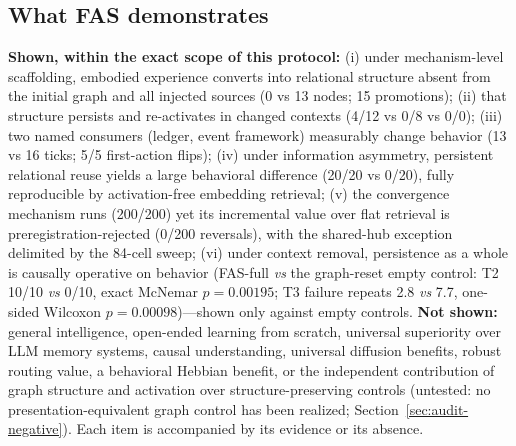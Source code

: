 \documentclass[10pt]{article}
\begin{document}
\subsection{What FAS demonstrates}
\textbf{Shown, within the exact scope of this protocol:} (i) under mechanism-level scaffolding, embodied experience converts into relational structure absent from the initial graph and all injected sources (0 vs 13 nodes; 15 promotions); (ii) that structure persists and re-activates in changed contexts (4/12 vs 0/8 vs 0/0); (iii) two named consumers (ledger, event framework) measurably change behavior (13 vs 16 ticks; 5/5 first-action flips); (iv) under information asymmetry, persistent relational reuse yields a large behavioral difference (20/20 vs 0/20), fully reproducible by activation-free embedding retrieval; (v) the convergence mechanism runs (200/200) yet its incremental value over flat retrieval is preregistration-rejected (0/200 reversals), with the shared-hub exception delimited by the 84-cell sweep; (vi) under context removal, persistence as a whole is causally operative on behavior (FAS-full \emph{vs} the graph-reset empty control: T2 10/10 \emph{vs} 0/10, exact McNemar $p{=}0.00195$; T3 failure repeats 2.8 \emph{vs} 7.7, one-sided Wilcoxon $p{=}0.00098$)---shown only against empty controls. \textbf{Not shown:} general intelligence, open-ended learning from scratch, universal superiority over LLM memory systems, causal understanding, universal diffusion benefits, robust routing value, a behavioral Hebbian benefit, or the independent contribution of graph structure and activation over structure-preserving controls (untested: no presentation-equivalent graph control has been realized; Section~\ref{sec:audit-negative}). Each item is accompanied by its evidence or its absence.
\end{document}
